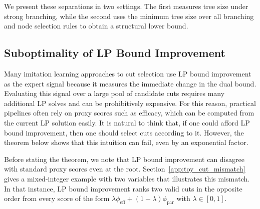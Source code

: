\documentclass[smallextended,envcountsect]{svjour3} %
\newcommand{\0}{\mathbf{0}}
\newcommand{\1}{\mathbf{1}} %
\begin{document}

We present these separations in two settings. The first measures tree size under strong branching, while the second uses the minimum tree size over all branching and node selection rules to obtain a structural lower bound.

\subsection{Suboptimality of LP Bound Improvement}

Many imitation learning approaches to cut selection use LP bound improvement as the expert signal because it measures the immediate change in the dual bound.
Evaluating this signal over a large pool of candidate cuts requires many additional LP solves and can be prohibitively expensive.
For this reason, practical pipelines often rely on proxy scores such as efficacy, which can be computed from the current LP solution easily.
It is natural to think that, if one could afford LP bound improvement, then one should select cuts according to it.
However, the theorem below shows that this intuition can fail, even by an exponential factor.

Before stating the theorem, we note that LP bound improvement can disagree with standard proxy scores even at the root.
Section~\ref{app:toy_cut_mismatch} gives a mixed-integer example with two variables that illustrates this mismatch.
In that instance, LP bound improvement ranks two valid cuts in the opposite order from every score of the form $\lambda \phi_{\text{eff}}+(1-\lambda)\phi_{\text{par}}$ with $\lambda\in[0,1]$.
\end{document}
